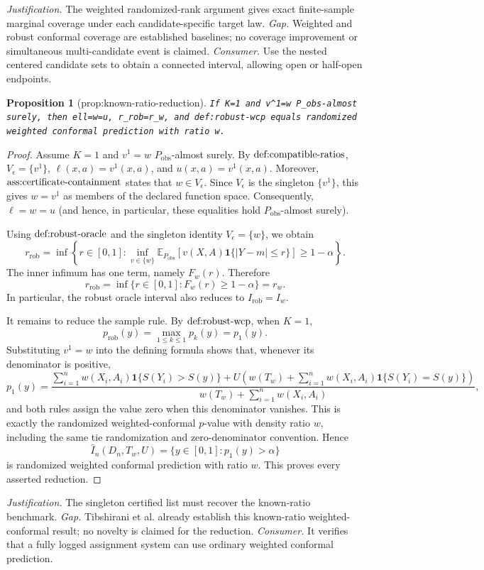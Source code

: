 \documentclass{article}
\newtheorem{proposition}{Proposition}
\begin{document}
\par\smallskip\noindent \textit{Justification.} The weighted randomized-rank argument gives exact finite-sample marginal coverage under each candidate-specific target law. \textit{Gap.} Weighted and robust conformal coverage are established baselines; no coverage improvement or simultaneous multi-candidate event is claimed. \textit{Consumer.} Use the nested centered candidate sets to obtain a connected interval, allowing open or half-open endpoints.

\begin{proposition}[prop:known-ratio-reduction]\label{prop:known-ratio-reduction}
\texttt{If K=1 and v\textasciicircum{}1=w P\_obs-almost surely, then ell=w=u, r\_rob=r\_w, and def:robust-wcp equals randomized weighted conformal prediction with ratio w.}
\end{proposition}
\begin{proof}
Assume \(K=1\) and \(v^1=w\) \(P_{\mathrm{obs}}\)-almost surely. By \(\textnormal{def:compatible-ratios}\), \(V_\epsilon=\{v^1\}\), \(\ell(x,a)=v^1(x,a)\), and \(u(x,a)=v^1(x,a)\). Moreover, \(\textnormal{ass:certificate-containment}\) states that \(w\in V_\epsilon\). Since \(V_\epsilon\) is the singleton \(\{v^1\}\), this gives \(w=v^1\) as members of the declared function space. Consequently, \(\ell=w=u\) (and hence, in particular, these equalities hold \(P_{\mathrm{obs}}\)-almost surely).

Using \(\textnormal{def:robust-oracle}\) and the singleton identity \(V_\epsilon=\{w\}\), we obtain
\[
r_{\mathrm{rob}}=\inf\left\{r\in[0,1]:\inf_{v\in\{w\}}\mathbb E_{P_{\mathrm{obs}}}\!\left[v(X,A)\mathbf 1\{|Y-m|\le r\}\right]\ge 1-\alpha\right\}.
\]
The inner infimum has one term, namely \(F_w(r)\). Therefore
\[
r_{\mathrm{rob}}=\inf\{r\in[0,1]:F_w(r)\ge 1-\alpha\}=r_w.
\]
In particular, the robust oracle interval also reduces to \(I_{\mathrm{rob}}=I_w\).

It remains to reduce the sample rule. By \(\textnormal{def:robust-wcp}\), when \(K=1\),
\[
p_{\mathrm{rob}}(y)=\max_{1\le k\le1}p_k(y)=p_1(y).
\]
Substituting \(v^1=w\) into the defining formula shows that, whenever its denominator is positive,
\[
p_1(y)=\frac{\sum_{i=1}^n w(X_i,A_i)\mathbf 1\{S(Y_i)>S(y)\}+U\!\left(w(T_w)+\sum_{i=1}^n w(X_i,A_i)\mathbf 1\{S(Y_i)=S(y)\}\right)}{w(T_w)+\sum_{i=1}^n w(X_i,A_i)},
\]
and both rules assign the value zero when this denominator vanishes. This is exactly the randomized weighted-conformal \(p\)-value with density ratio \(w\), including the same tie randomization and zero-denominator convention. Hence
\[
\widehat I_n(D_n,T_w,U)=\{y\in[0,1]:p_1(y)>\alpha\}
\]
is randomized weighted conformal prediction with ratio \(w\). This proves every asserted reduction.
\end{proof}
\par\smallskip\noindent \textit{Justification.} The singleton certified list must recover the known-ratio benchmark. \textit{Gap.} Tibshirani et al. already establish this known-ratio weighted-conformal result; no novelty is claimed for the reduction. \textit{Consumer.} It verifies that a fully logged assignment system can use ordinary weighted conformal prediction.
\end{document}
